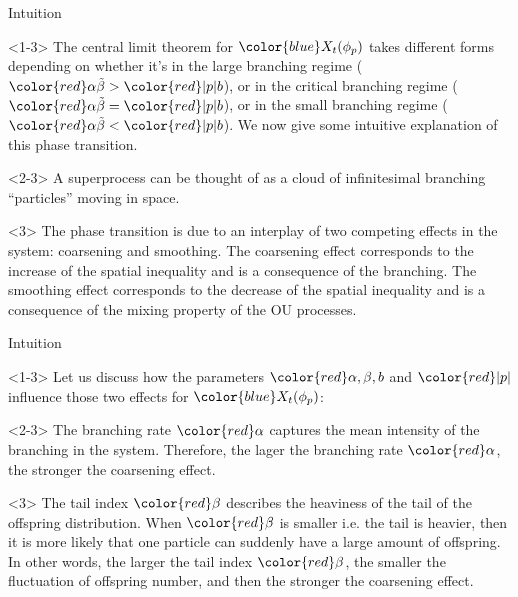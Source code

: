\documentclass[xcolor=dvipsnames]{beamer}
\begin{document}
\begin{frame}{Intuition}
\begin{block}{}<1-3>
	The central limit theorem for $\color{blue}X_t(\phi_p)$ takes different forms depending on whether it's in the {\color{PineGreen}large branching regime} (${\color{red}\alpha \tilde \beta > {\color{red}|p|}  b}$), or in the {\color{PineGreen}critical branching regime} (${\color{red}\alpha \tilde \beta = {\color{red}|p|}  b}$), or in the {\color{PineGreen}small branching regime} (${\color{red}\alpha \tilde \beta < {\color{red}|p|}  b}$).
	We now give some intuitive explanation of this phase transition.
\end{block}
\begin{block}{}<2-3>
	A superprocess can be thought of as a cloud of infinitesimal branching ``particles'' moving in space.
\end{block}
\begin{block}{}<3>
	The phase transition is due to an interplay of two competing effects in the system: {\color{PineGreen}coarsening} and {\color{PineGreen}smoothing}.
	The {\color{PineGreen}coarsening effect} corresponds to the increase of the spatial inequality and is a consequence of the branching.
	The {\color{PineGreen}smoothing effect} corresponds to the decrease of the spatial inequality and is a consequence of the mixing property of the OU processes.
\end{block}
\end{frame}

\begin{frame}{Intuition}
\begin{block}{}<1-3>
	Let us discuss how the parameters $\color{red}\alpha, \beta, b$ and ${\color{red}|p|}$
	influence those two effects for $\color{blue}X_t(\phi_p)$:
\end{block}
\begin{block}{}<2-3>
		The {\color{PineGreen}branching rate} $\color{red}\alpha$ captures the mean intensity of the branching in the system.
		Therefore, the {\color{PineGreen}lager the branching rate} $\color{red}\alpha$, the {\color{PineGreen}stronger the coarsening effect}.
\end{block}
\begin{block}{}<3>
		The {\color{PineGreen}tail index} $\color{red}\beta$ describes the heaviness of the tail of the offspring distribution.
		When $\color{red}\beta$ is smaller i.e. the tail is heavier, then it is more likely that 
		one particle can suddenly have a large amount of offspring.
		In other words, the {\color{PineGreen} larger the tail index} $\color{red}\beta$, the smaller the fluctuation of offspring number, and then the {\color{PineGreen} stronger the coarsening effect}.
\end{block}
\end{frame}
\end{document}

